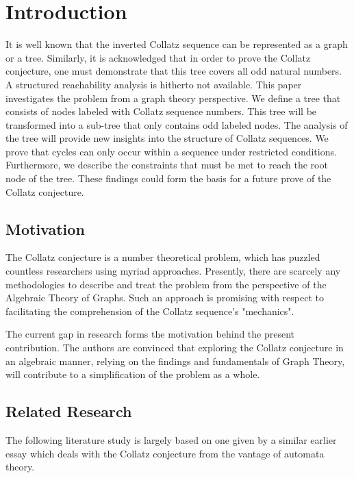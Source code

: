 \chapter{Introduction}

\begin{summary}
It is well known that the inverted Collatz sequence can be represented as a graph or a tree. Similarly, it is acknowledged that in order to prove the Collatz conjecture, one must demonstrate that this tree covers all odd natural numbers. A structured reachability analysis is hitherto not available. This paper investigates the problem from a graph theory perspective. We define a tree that consists of nodes labeled with Collatz sequence numbers. This tree will be transformed into a sub-tree that only contains odd labeled nodes. The analysis of the tree will provide new insights into the structure of Collatz sequences. We prove that cycles can only occur within a sequence under restricted conditions. Furthermore, we describe the constraints that must be met to reach the root node of the tree. These findings could form the basis for a future prove of the Collatz conjecture.
\end{summary}

\section{Motivation}
The Collatz conjecture is a number theoretical problem, which has puzzled countless researchers using myriad approaches. Presently, there are scarcely any methodologies to describe and treat the problem from the perspective of the Algebraic Theory of Graphs. Such an approach is promising with respect to facilitating the comprehension of the Collatz sequence’s "mechanics".

\par\medskip
The current gap in research forms the motivation behind the present contribution. The authors are convinced that exploring the Collatz conjecture in an algebraic manner, relying on the ﬁndings and fundamentals of Graph Theory, will contribute to a simplification of the problem as a whole.

\section{Related Research}
The following literature study is largely based on one given by a similar earlier essay \cite{Ref_Sultanow_Volkov_Cox_2017} which deals with the Collatz conjecture from the vantage of automata theory.


